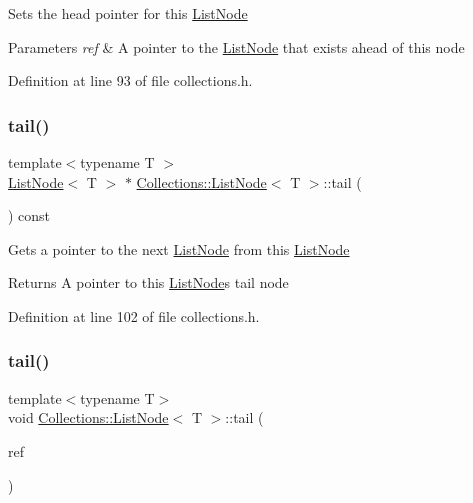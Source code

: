 Sets the head pointer for this \hyperlink{class_collections_1_1_list_node}{List\+Node} 
\begin{DoxyParams}{Parameters}
{\em ref} & A pointer to the \hyperlink{class_collections_1_1_list_node}{List\+Node} that exists ahead of this node \\
\hline
\end{DoxyParams}


Definition at line 93 of file collections.\+h.

\hypertarget{class_collections_1_1_list_node_a102a97a1589e2df0797a9717bbecd952}{}\label{class_collections_1_1_list_node_a102a97a1589e2df0797a9717bbecd952} 
\subsubsection{\texorpdfstring{tail()}{tail()}\hspace{0.1cm}{\footnotesize\ttfamily [1/2]}}
{\footnotesize\ttfamily template$<$typename T $>$ \\
\hyperlink{class_collections_1_1_list_node}{List\+Node}$<$ T $>$ $\ast$ \hyperlink{class_collections_1_1_list_node}{Collections\+::\+List\+Node}$<$ T $>$\+::tail (\begin{DoxyParamCaption}{ }\end{DoxyParamCaption}) const}

Gets a pointer to the next \hyperlink{class_collections_1_1_list_node}{List\+Node} from this \hyperlink{class_collections_1_1_list_node}{List\+Node} \begin{DoxyReturn}{Returns}
A pointer to this \hyperlink{class_collections_1_1_list_node}{List\+Node}\textquotesingle{}s tail node 
\end{DoxyReturn}


Definition at line 102 of file collections.\+h.

\hypertarget{class_collections_1_1_list_node_aa2a2e35182902b354508841661bf181c}{}\label{class_collections_1_1_list_node_aa2a2e35182902b354508841661bf181c} 
\subsubsection{\texorpdfstring{tail()}{tail()}\hspace{0.1cm}{\footnotesize\ttfamily [2/2]}}
{\footnotesize\ttfamily template$<$typename T$>$ \\
void \hyperlink{class_collections_1_1_list_node}{Collections\+::\+List\+Node}$<$ T $>$\+::tail (\begin{DoxyParamCaption}\item[{\hyperlink{class_collections_1_1_list_node}{List\+Node}$<$ T $>$ $\ast$}]{ref }\end{DoxyParamCaption})}

